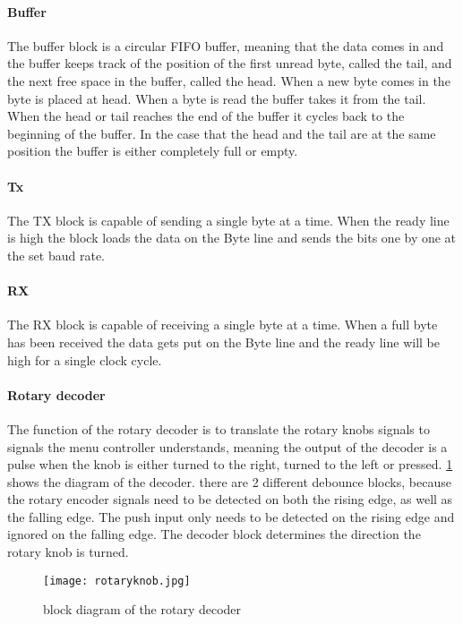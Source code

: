 \paragraph{Buffer}
The buffer block is a circular FIFO buffer, meaning that the data comes in and the buffer keeps track of the position of the first unread byte, called the tail, and the next free space in the buffer, called the head. When a new byte comes in the byte is placed at head. When a byte is read the buffer takes it from the tail. When the head or tail reaches the end of the buffer it cycles back to the beginning of the buffer. In the case that the head and the tail are at the same position the buffer is either completely full or empty.

\paragraph{Tx}
The TX block is capable of sending a single byte at a time. When the ready line is high the block loads the data on the Byte line and sends the bits one by one at the set baud rate.

\paragraph{RX}
The RX block is capable of receiving a single byte at a time. When a full byte has been received the data gets put on the Byte line and the ready line will be high for a single clock cycle.

\paragraph{Rotary decoder}
The function of the rotary decoder is to translate the rotary knobs signals to signals the menu controller understands, meaning the output of the decoder is a pulse when the knob is either turned to the right, turned to the left or pressed. \ref{fig:rotary-decoder} shows the diagram of the decoder. there are 2 different debounce blocks, because the rotary encoder signals need to be detected on both the rising edge, as well as the falling edge. The push input only needs to be detected on the rising edge and ignored on the falling edge. The decoder block determines the direction the rotary knob is turned.

\begin{figure}
    \texttt{[image: rotaryknob.jpg]}
    \caption{block diagram of the rotary decoder}
    \label{fig:rotary-decoder} 
\end{figure}


